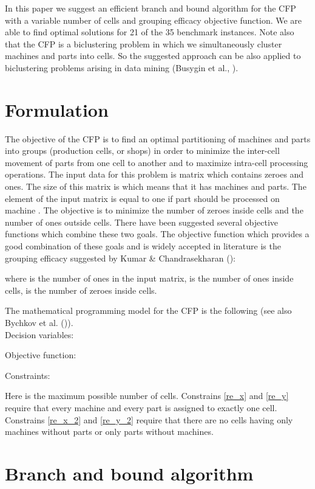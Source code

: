 \documentclass[citeauthoryear]{llncs}
\begin{document}
In this paper we suggest an efficient branch and bound algorithm for the CFP with a variable number of cells and grouping efficacy objective function.
We are able to find optimal solutions for 21 of the 35 benchmark instances.
Note also that the CFP is a biclustering problem in which we simultaneously cluster machines and parts into cells.
So the suggested approach can be also applied to biclustering problems arising in data mining (Busygin et al., \cite{Busygin}).

\section{Formulation}
The objective of the CFP is to find an optimal partitioning of machines and parts into groups (production cells, or shops) in order to minimize the inter-cell movement of parts from one cell to another and to maximize intra-cell processing operations. The input data for this problem is matrix  which contains zeroes and ones. The size of this matrix is  which means that it has  machines and  parts. The element  of the input matrix is equal to one if part  should be processed on machine .  The objective is to minimize the number of zeroes inside cells and the number of ones outside cells. There have been suggested several objective functions which combine these two goals.
The objective function which provides a good combination of these goals and is widely accepted in literature is the grouping efficacy suggested by Kumar \& Chandrasekharan (\cite{3}):

where  is the number of ones in the input matrix,  is the number of ones inside cells,  is the number of zeroes inside cells.

The mathematical programming model for the CFP is the following (see also Bychkov et al. (\cite{Bychkov})).\\
Decision variables:


Objective function:

Constraints:






Here  is the maximum possible number of cells. Constrains \eqref{re_x} and \eqref{re_y} require that every machine and every part is assigned to exactly one cell. Constrains \eqref{re_x_2} and \eqref{re_y_2} require that there are no cells having only machines without parts or only parts without machines.

\section{Branch and bound algorithm}
\end{document}
